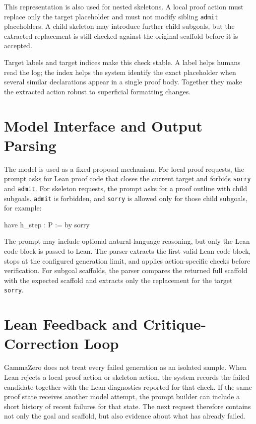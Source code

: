 This representation is also used for nested skeletons. A local proof action must replace only the target placeholder and must not modify sibling \texttt{admit} placeholders. A child skeleton may introduce further child subgoals, but the extracted replacement is still checked against the original scaffold before it is accepted.

Target labels and target indices make this check stable. A label helps humans read the log; the index helps the system identify the exact placeholder when several similar declarations appear in a single proof body. Together they make the extracted action robust to superficial formatting changes.

\section{Model Interface and Output Parsing}

The model is used as a fixed proposal mechanism. For local proof requests, the prompt asks for Lean proof code that closes the current target and forbids \texttt{sorry} and \texttt{admit}. For skeleton requests, the prompt asks for a proof outline with child subgoals. \texttt{admit} is forbidden, and \texttt{sorry} is allowed only for those child subgoals, for example:
\begin{leanblock}
have h_step : P := by
  sorry
\end{leanblock}

The prompt may include optional natural-language reasoning, but only the Lean code block is passed to Lean. The parser extracts the first valid Lean code block, stops at the configured generation limit, and applies action-specific checks before verification. For subgoal scaffolds, the parser compares the returned full scaffold with the expected scaffold and extracts only the replacement for the target \texttt{sorry}.

\section{Lean Feedback and Critique-Correction Loop}
\label{subsec:lean-feedback}

GammaZero does not treat every failed generation as an isolated sample. When Lean rejects a local proof
action or skeleton action, the system records the failed candidate together with the Lean diagnostics
reported for that check. If the same proof state receives another model attempt, the prompt builder can
include a short history of recent failures for that state. The next request therefore contains not only the
goal and scaffold, but also evidence about what has already failed.

